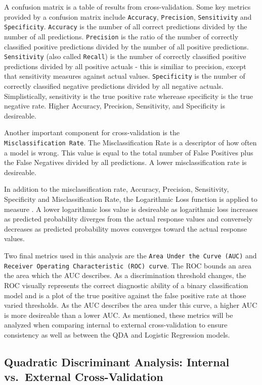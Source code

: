 \documentclass[american,]{article}
\begin{document}
A confusion matrix is a table of results from cross-validation. Some key metrics provided by a confusion matrix include \texttt{Accuracy}, \texttt{Precision}, \texttt{Sensitivity} and \texttt{Specificity}. \texttt{Accuracy} is the number of all correct predictions divided by the number of all predictions. \texttt{Precision} is the ratio of the number of correctly classified positive predictions divided by the number of all positive predictions. \texttt{Sensitivity} (also called \texttt{Recall}) is the number of correctly classified positive predictions divided by all positive actuals - this is similiar to precision, except that sensitivity measures against actual values. \texttt{Specificity} is the number of correctly classified negative predictions divided by all negative actuals. Simplistically, sensitivity is the true positive rate wherease specificity is the true negative rate. Higher Accuracy, Precision, Sensitivity, and Specificity is desireable.

Another important component for cross-validation is the \texttt{Misclassification\ Rate}. The Misclassification Rate is a descriptor of how often a model is wrong. This value is equal to the total number of False Positives plus the False Negatives divided by all predictions. A lower misclassification rate is desireable.

In addition to the misclassification rate, Accuracy, Precision, Sensitivity, Specificity and Misclassification Rate, the Logarithmic Loss function is applied to measure . A lower logarithmic loss value is desireable as logarithmic loss increases as predicted probability diverges from the actual response values and conversely decreases as predicted probability moves converges toward the actual response values.

Two final metrics used in this analysis are the \texttt{Area\ Under\ the\ Curve\ (AUC)} and \texttt{Receiver\ Operating\ Characteristic\ (ROC)\ curve}. The ROC bounds an area the area which the AUC describes. As a discrimination threshold changes, the ROC visually represents the correct diagnostic ability of a binary classification model and is a plot of the true positive against the false positive rate at those varied thresholds. As the AUC describes the area under this curve, a higher AUC is more desireable than a lower AUC. As mentioned, these metrics will be analyzed when comparing internal to external cross-validation to ensure consistency as well as between the QDA and Logistic Regression models.

\hypertarget{quadratic-discriminant-analysis-internal-vs.external-cross-validation}{%
\subsection{\texorpdfstring{\textbf{Quadratic Discriminant Analysis: Internal vs.~External Cross-Validation}}{Quadratic Discriminant Analysis: Internal vs.~External Cross-Validation}}\label{quadratic-discriminant-analysis-internal-vs.external-cross-validation}}
\end{document}
